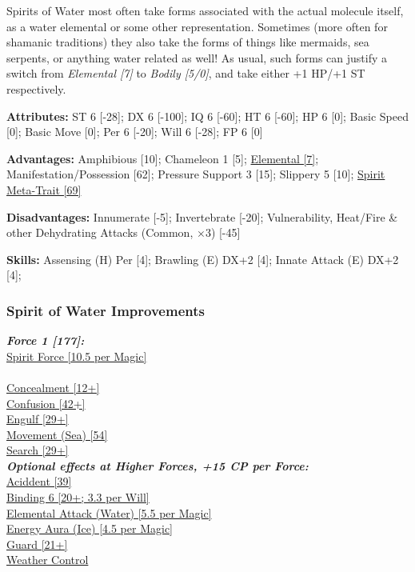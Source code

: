 \begin{multicols*}{3}
	Spirits of Water most often take forms associated with the actual molecule itself, as a water elemental or some other representation. Sometimes (more often for shamanic traditions) they also take the forms of things like mermaids, sea serpents, or anything water related as well! As usual, such forms can justify a switch from \textit{Elemental [7]} to \textit{Bodily [5/0]}, and take either +1 HP/+1 ST respectively.
	
	\textbf{Attributes:}
	ST 6 [-28]; DX 6 [-100]; IQ 6 [-60]; HT 6 [-60]; HP 6 [0]; Basic Speed  [0]; Basic Move  [0]; Per 6 [-20]; Will 6 [-28]; FP 6 [0]
	
	\textbf{Advantages:}
	Amphibious [10]; Chameleon 1 [5]; \hyperref[elemental]{Elemental [7]}; Manifestation/Possession [62]; Pressure Support 3 [15]; Slippery 5 [10]; \hyperref[spirit_meta_trait]{Spirit Meta-Trait [69]}
	
	\textbf{Disadvantages:}
	Innumerate [-5]; Invertebrate [-20]; Vulnerability, Heat/Fire \& other Dehydrating Attacks (Common, \(\times3\)) [-45]
	
	\textbf{Skills:}
	Assensing (H) Per [4]; Brawling (E) DX+2 [4]; Innate Attack (E) DX+2 [4];
	
	\subsubsection*{Spirit of Water Improvements}
	
	\textbf{\textit{Force 1 [177]:\\}}
	\hyperref[spirit_force]{Spirit Force [10.5 per Magic]}\\\\
	\hyperref[concealment]{Concealment [12+]}\\
	\hyperref[confusion]{Confusion [42+]}\\
	\hyperref[engulf]{Engulf [29+]}\\
	\hyperref[movement]{Movement (Sea) [54]}\\
	\hyperref[search]{Search [29+]}\\
	
	\textbf{\textit{Optional effects at Higher Forces, +15 CP per Force:\\}}
	\hyperref[accident]{Aciddent [39]}\\
	\hyperref[binding]{Binding 6 [20+; 3.3 per Will]}\\
	\hyperref[elemental_attack]{Elemental Attack (Water) [5.5 per Magic]}\\
	\hyperref[energy_aura]{Energy Aura (Ice) [4.5 per Magic]}\\
	\hyperref[guard]{Guard [21+]}\\
	\hyperref[weather_control]{Weather Control}\\
	

\end{multicols*}
